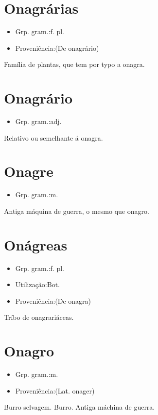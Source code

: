 \section{Onagrárias}
\begin{itemize}
\item {Grp. gram.:f. pl.}
\end{itemize}
\begin{itemize}
\item {Proveniência:(De \textunderscore onagrário\textunderscore )}
\end{itemize}
Família de plantas, que tem por typo a onagra.
\section{Onagrário}
\begin{itemize}
\item {Grp. gram.:adj.}
\end{itemize}
Relativo ou semelhante á onagra.
\section{Onagre}
\begin{itemize}
\item {Grp. gram.:m.}
\end{itemize}
Antiga máquina de guerra, o mesmo que \textunderscore onagro\textunderscore .
\section{Onágreas}
\begin{itemize}
\item {Grp. gram.:f. pl.}
\end{itemize}
\begin{itemize}
\item {Utilização:Bot.}
\end{itemize}
\begin{itemize}
\item {Proveniência:(De \textunderscore onagra\textunderscore )}
\end{itemize}
Tríbo de onagrariáceas.
\section{Onagro}
\begin{itemize}
\item {Grp. gram.:m.}
\end{itemize}
\begin{itemize}
\item {Proveniência:(Lat. \textunderscore onager\textunderscore )}
\end{itemize}
Burro selvagem.
Burro.
Antiga máchina de guerra.
